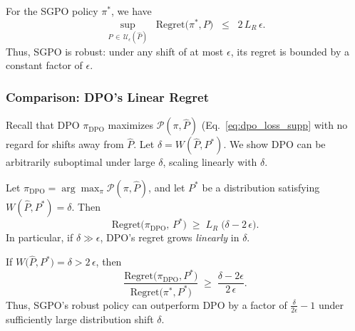 \begin{theorem}
\label{thm:sgpo_regret}
For the SGPO policy \(\pi^*\), we have
\begin{equation}
\sup_{P \,\in\,\mathcal{U}_\epsilon(\hat{P})}
\;\;
\text{Regret}\bigl(\pi^*,P\bigr)
\;\;\le\;\;
2\,L_R\,\epsilon.
\end{equation}
Thus, SGPO is robust: under any shift of at most \(\epsilon\), its regret is bounded by a constant factor of \(\epsilon\).
\end{theorem}

\subsubsection{Comparison: DPO’s Linear Regret}
\label{sec:compare_dpo}

Recall that DPO $\pi_{\mathrm{DPO}}$ \citep{Rafailov2023Direct} maximizes $\mathcal{P}(\pi,\hat{P})$ (Eq.~\eqref{eq:dpo_loss_supp} with no regard for shifts away from $\hat{P}$.  Let $\delta = W(\hat{P},P^*)$.  We show DPO can be arbitrarily suboptimal under large $\delta$, scaling linearly with $\delta$.

\begin{theorem}
\label{thm:dpo_regret_lowerbound}
Let $\pi_{\mathrm{DPO}}=\arg\max_{\pi}\mathcal{P}(\pi,\hat{P})$, and let $P^*$ be a distribution satisfying $W(\hat{P},P^*)=\delta$.  Then
\begin{equation}
\text{Regret}\bigl(\pi_{\mathrm{DPO}},\,P^*\bigr)
\;\ge\;
L_R\;\bigl(\delta - 2\,\epsilon\bigr).
\end{equation}
In particular, if $\delta \gg \epsilon$, DPO’s regret grows \emph{linearly} in $\delta$.
\end{theorem}

\begin{corollary}
\label{cor:sgpo_advantage}
If $W\!\bigl(\hat{P},P^*\bigr)=\delta > 2\,\epsilon$, then
\begin{equation}
\frac{\text{Regret}\bigl(\pi_{\mathrm{DPO}},P^*\bigr)}%
     {\text{Regret}\bigl(\pi^{*},P^*\bigr)}
\;\ge\;
\frac{\delta - 2\epsilon}{2\,\epsilon}.
\end{equation}
Thus, SGPO’s robust policy can outperform DPO by a factor of $\tfrac{\delta}{2\epsilon} - 1$ under sufficiently large distribution shift $\delta$.
\end{corollary}

